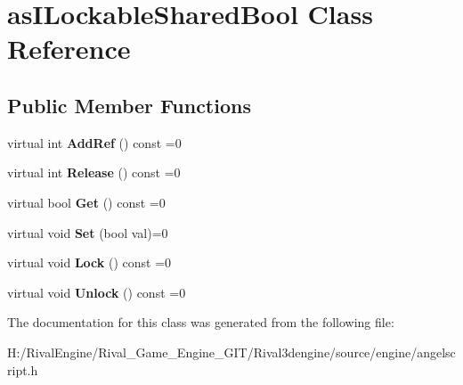 \hypertarget{classas_i_lockable_shared_bool}{}\section{as\+I\+Lockable\+Shared\+Bool Class Reference}
\label{classas_i_lockable_shared_bool}
\subsection*{Public Member Functions}
\begin{DoxyCompactItemize}
\item 
\mbox{\label{classas_i_lockable_shared_bool_a1183742552ce6b952cc3742bd456d787}} 
virtual int {\bfseries Add\+Ref} () const =0
\item 
\mbox{\label{classas_i_lockable_shared_bool_a1dae71f6f1141b5b16520232a9ea5fb2}} 
virtual int {\bfseries Release} () const =0
\item 
\mbox{\label{classas_i_lockable_shared_bool_abab39fc60f00ae8941423258ffc2c3c6}} 
virtual bool {\bfseries Get} () const =0
\item 
\mbox{\label{classas_i_lockable_shared_bool_aa29488ac2f1c38788d5e79545fdfc8c7}} 
virtual void {\bfseries Set} (bool val)=0
\item 
\mbox{\label{classas_i_lockable_shared_bool_aef12cc309395d682aa138da5eea9d82b}} 
virtual void {\bfseries Lock} () const =0
\item 
\mbox{\label{classas_i_lockable_shared_bool_a863984c1b271df84f71fb5ba978ce2b8}} 
virtual void {\bfseries Unlock} () const =0
\end{DoxyCompactItemize}


The documentation for this class was generated from the following file\+:\begin{DoxyCompactItemize}
\item 
H\+:/\+Rival\+Engine/\+Rival\+\_\+\+Game\+\_\+\+Engine\+\_\+\+G\+I\+T/\+Rival3dengine/source/engine/angelscript.\+h\end{DoxyCompactItemize}
